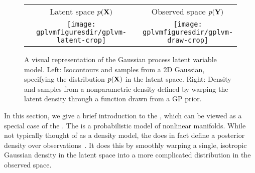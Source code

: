 \begin{figure}
\begin{centering}
{\begin{tabular}{cccc}
\phantom{h} & Latent space $p(\mathbf{X})$ & & Observed space $p(\mathbf{Y})$ \\
& \fbox{\texttt{[image: \\gplvmfiguresdir/gplvm-latent-crop]}} &
\raisebox{7em}{$\overset{\mathlarger{f(x)}}{\mathlarger{\mathlarger{\mathlarger{\mathlarger{\mathlarger{\mathlarger{\mathlarger{\rightarrow}}}}}}}}$} &
\fbox{\texttt{[image: \\gplvmfiguresdir/gplvm-draw-crop]}}
\end{tabular}}
\end{centering}
\caption[Two-dimensional Gaussian process latent variable model]{A visual representation of the Gaussian process latent variable model.  Left:  Isocontours and samples from a 2D Gaussian, specifying the distribution $p(\mathbf{X})$ in the latent space.  Right: Density and samples from a nonparametric density defined by warping the latent density through a function drawn from a GP prior.}  
\label{fig:twod-gplvm}
\end{figure}



In this section, we give a brief introduction to the \gplvm{}, which can be viewed as a special case of the \iwmm{}.
The \gplvm{} is a probabilistic model of nonlinear manifolds.
While not typically thought of as a density model, the \gplvm{} does in fact define a posterior density over observations~\cite{nickisch2010gaussian}.
It does this by smoothly warping a single, isotropic Gaussian density in the latent space into a more complicated distribution in the observed space.  


